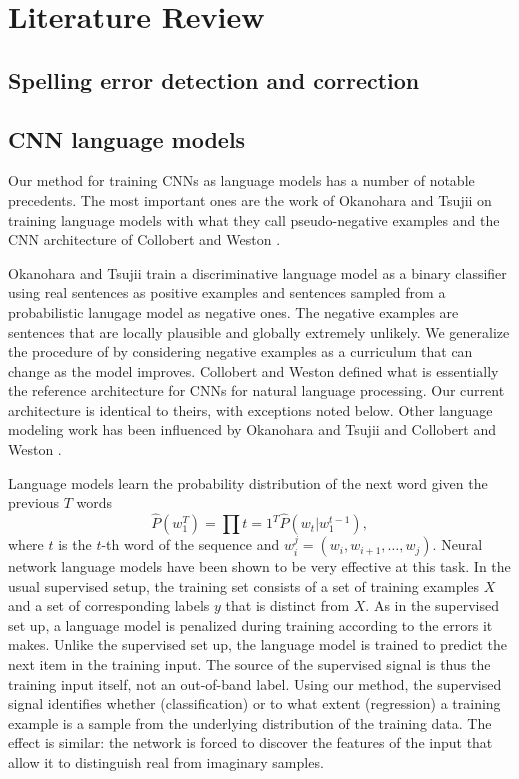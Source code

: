 \chapter{Literature Review}
\label{chap:LiteratureReview}

\section{Spelling error detection and correction}


\section{CNN language models}

Our method for training CNNs as language models has a number of notable
precedents.  The most important ones are the work of Okanohara and
Tsujii on training language models with what they call pseudo-negative
examples \cite{Okanohara2007-zp} and the CNN architecture of Collobert
and Weston \cite{Collobert2008-su}.

Okanohara and Tsujii train a discriminative language model as a binary
classifier using real sentences as positive examples and sentences sampled
from a probabilistic lanugage model as negative ones.  The negative
examples are sentences that are locally plausible and globally extremely
unlikely.  We generalize the procedure of \cite{Okanohara2007-zp}
by considering negative examples as a curriculum \cite{Bengio2009-ua}
that can change as the model improves.  Collobert and Weston defined
what is essentially the reference architecture for CNNs for natural
language processing.  Our current architecture is identical to theirs,
with exceptions noted below.  Other language modeling work has been
influenced by Okanohara and Tsujii \cite{Sandbank2008-ow} and Collobert
and Weston \cite{Xu2012-ci}.

Language models learn the probability distribution of the next word given
the previous $T$ words \begin{equation} \hat{P}(w_{1}^T) = \prod{t=1}^{T}
\hat{P}(w_t | w_{1}^{t-1}), \end{equation} where $t$ is the $t$-th word
of the sequence and $w_{i}^j = (w_i, w_{i+1}, \ldots, w_{j})$.  Neural
network language models \cite{Bengio2003-lk,Mikolov2011-pe,Mikolov2013-hm}
have been shown to be very effective at this task.  In the usual
supervised setup, the training set consists of a set of training examples
$X$ and a set of corresponding labels $y$ that is distinct from $X$.
As in the supervised set up, a language model is penalized during training
according to the errors it makes.  Unlike the supervised set up, the
language model is trained to predict the next item in the training input.
The source of the supervised signal is thus the training input itself, not
an out-of-band label.  Using our method, the supervised signal identifies
whether (classification) or to what extent (regression) a training example
is a sample from the underlying distribution of the training data.
The effect is similar: the network is forced to discover the features
of the input that allow it to distinguish real from imaginary samples.

